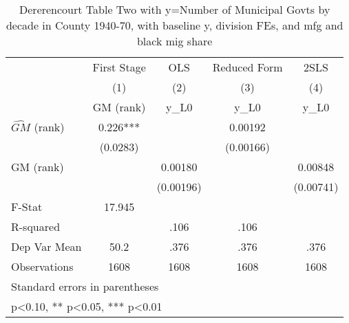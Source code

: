 \begin{table}[htbp]\centering
\def\sym#1{\ifmmode^{#1}\else\(^{#1}\)\fi}
\caption{Dererencourt Table Two with y=Number of Municipal Govts by decade in County 1940-70, with baseline y, division FEs, and mfg and black mig share}
\begin{tabular}{l*{4}{c}}
\toprule
                    & First Stage   &         OLS   &Reduced Form   &        2SLS   \\
                    &\multicolumn{1}{c}{(1)}&\multicolumn{1}{c}{(2)}&\multicolumn{1}{c}{(3)}&\multicolumn{1}{c}{(4)}\\
                    &\multicolumn{1}{c}{GM  (rank)}&\multicolumn{1}{c}{y\_L0}&\multicolumn{1}{c}{y\_L0}&\multicolumn{1}{c}{y\_L0}\\
\midrule
$\hat{GM}$ (rank)   &       0.226***&               &     0.00192   &               \\
                    &    (0.0283)   &               &   (0.00166)   &               \\
\addlinespace
GM  (rank)          &               &     0.00180   &               &     0.00848   \\
                    &               &   (0.00196)   &               &   (0.00741)   \\
\midrule
F-Stat              &      17.945   &               &               &               \\
R-squared           &               &        .106   &        .106   &               \\
Dep Var Mean        &        50.2   &        .376   &        .376   &        .376   \\
Observations        &        1608   &        1608   &        1608   &        1608   \\
\bottomrule
\multicolumn{5}{l}{\footnotesize Standard errors in parentheses}\\
\multicolumn{5}{l}{\footnotesize * p<0.10, ** p<0.05, *** p<0.01}\\
\end{tabular}
\end{table}
